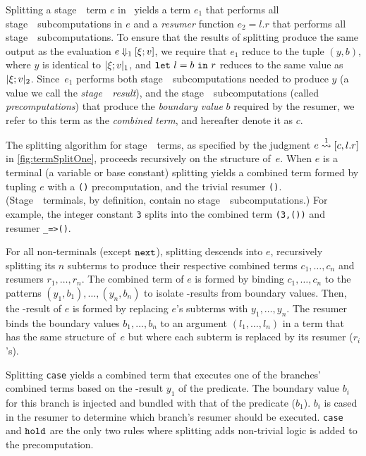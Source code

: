 Splitting a stage~\bbone\ term $e$ in \lang\ yields a term 
$e_1$ that performs all stage~\bbone\ subcomputations in $e$ and a \emph{resumer} function $e_2 = l.r$ that performs all stage~\bbtwo\ subcomputations.
To ensure that the results of splitting produce the same output as the evaluation $e\mathbin{{\Downarrow_{ 1}}}[\xi;v]$,
we require that $e_1$ reduce to the tuple $(y,b)$,
where $y$ is identical to $|\xi;v|_{ 1}$, and 
${\tt let}~{l} = {b}~{\tt in}~{r}$ reduces to the same value as $|\xi;v|_{ 2}$. Since~$e_1$ performs both stage~\bbone\ subcomputations needed to produce $y$ (a value we call the \emph{stage~\bbone\ result}), and the stage~\bbone\ subcomputations (called \emph{precomputations}) that produce the \emph{boundary value} $b$ required by the resumer, we refer to this term as the \emph{combined term}, and hereafter denote it as $c$.

The splitting algorithm for stage~\bbone\ terms, as specified by the
judgment $e \overset{ 1}\rightsquigarrow [c,l.r]$ in \cref{fig:termSplitOne}, proceeds
recursively on the structure of~$e$.
When $e$ is a terminal (a variable or base constant)
splitting yields a combined term formed by tupling $e$ with a \texttt{()} precomputation, and the trivial resumer \texttt{()}. (Stage~\bbone\ terminals, by definition, contain no stage~\bbtwo\ subcomputations.)  For example, the integer constant \texttt{3} splits into the combined term \texttt{(3,())} and resumer \texttt{\_=>()}.


For all non-terminals (except ${\tt next}$),
splitting descends into $e$, recursively splitting its $n$ subterms
to produce their respective combined terms $c_1,\ldots,c_n$ and resumers $r_1, \ldots, r_n$.
The combined term of $e$ is formed by binding $c_1,\ldots,c_n$
to the patterns $(y_1,b_1),\ldots,(y_n,b_n)$
to isolate \bbone-results from boundary values. Then,
the \bbone-result of $e$ is formed by replacing $e$'s subterms with $y_1,\ldots,y_n$.
The resumer binds the boundary values $b_1,\ldots,b_n$ to an
argument $(l_1,\ldots,l_n)$ in a term that has the same structure
of~$e$ but where each subterm is replaced by its resumer ($r_i$'s).

Splitting {\tt case} yields a combined term that executes one of the branches' combined terms based on the \bbone-result $y_1$ of the predicate.
The boundary value $b_i$ for this branch is injected and bundled with that of the predicate ($b_1$).   
$b_i$ is cased in the resumer to determine which branch's resumer should be executed.
{\tt case} and ${\tt hold}$ are the only two rules where splitting adds non-trivial logic is added to the precomputation.

